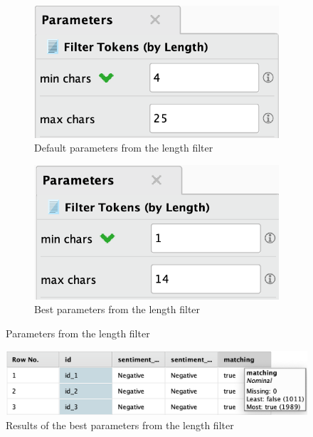 \documentclass[a4paper]{article}
\begin{document}
\begin{figure}[H]
    \centering
    \begin{subfigure}[b]{0.4\textwidth}
        \includegraphics[width=\textwidth]{imgs/part_3/3_processing_documents_filter_tokens_default_params}
        \caption{Default parameters from the length filter}
        \label{fig:3_processing_documents_filter_tokens_default_params}
    \end{subfigure}
    \hspace{0.1\textwidth}
    \begin{subfigure}[b]{0.4\textwidth}
        \includegraphics[width=\textwidth]{imgs/part_3/3_processing_documents_filter_tokens_best_params}
        \caption{Best parameters from the length filter}
        \label{fig:3_processing_documents_filter_tokens_best_params}
    \end{subfigure}
    \caption{Parameters from the length filter}
    \label{fig:3_processing_documents_filter_tokens_params}
\end{figure}

\begin{figure}[H]
	\centering
	\includegraphics[width=\linewidth]{imgs/part_3/3_processing_documents_no_stem_best_results}
	\caption{Results of the best parameters from the length filter}
	\label{fig:3_processing_documents_no_stem_best_results}
\end{figure}
\end{document}
